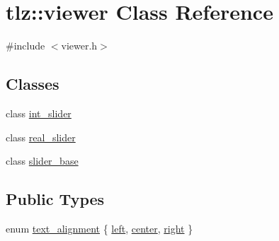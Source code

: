 \hypertarget{classtlz_1_1viewer}{}\section{tlz\+:\+:viewer Class Reference}
\label{classtlz_1_1viewer}


{\ttfamily \#include $<$viewer.\+h$>$}

\subsection*{Classes}
\begin{DoxyCompactItemize}
\item 
class \hyperlink{classtlz_1_1viewer_1_1int__slider}{int\+\_\+slider}
\item 
class \hyperlink{classtlz_1_1viewer_1_1real__slider}{real\+\_\+slider}
\item 
class \hyperlink{classtlz_1_1viewer_1_1slider__base}{slider\+\_\+base}
\end{DoxyCompactItemize}
\subsection*{Public Types}
\begin{DoxyCompactItemize}
\item 
enum \hyperlink{classtlz_1_1viewer_a280addd8c203232bdaf5ae4dc85a139a}{text\+\_\+alignment} \{ \hyperlink{classtlz_1_1viewer_a280addd8c203232bdaf5ae4dc85a139aa7d9efcc435fbfbde49c6c8e256405f68}{left}, 
\hyperlink{classtlz_1_1viewer_a280addd8c203232bdaf5ae4dc85a139aa896ad3baba90240ef5aa5c2c66b14fcf}{center}, 
\hyperlink{classtlz_1_1viewer_a280addd8c203232bdaf5ae4dc85a139aa242c9b07c716c6be5cade53a54244ec3}{right}
 \}
\end{DoxyCompactItemize}
